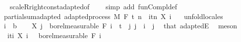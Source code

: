 \begin{isabellebody}
\isadelimproof
\ %
\endisadelimproof
%
\isatagproof
{}\isamarkupfalse%
\ scaleR{\isacharunderscore}{\kern0pt}right{\isacharunderscore}{\kern0pt}const{\isacharunderscore}{\kern0pt}adapted{\isacharbrackleft}{\kern0pt}of\ {\isachardoublequoteopen}{\isasymlambda}{\isacharunderscore}{\kern0pt}{\isachardot}{\kern0pt}\ {\isacharminus}{\kern0pt}{}{\isachardoublequoteclose}{\isacharbrackright}{\kern0pt}\ \isamarkupfalse%
\ {\isacharparenleft}{\kern0pt}simp\ add{\isacharcolon}{\kern0pt}\ fun{\isacharunderscore}{\kern0pt}Compl{\isacharunderscore}{\kern0pt}def{\isacharparenright}{\kern0pt}%
\endisatagproof
{\isafoldproof}%
%
\isadelimproof
%
\endisadelimproof
\isanewline
\isanewline
{}\isamarkupfalse%
\ partial{\isacharunderscore}{\kern0pt}sum{\isacharunderscore}{\kern0pt}adapted{\isacharcolon}{\kern0pt}\ {\isachardoublequoteopen}adapted{\isacharunderscore}{\kern0pt}process\ M\ F\ t\ {\isacharparenleft}{\kern0pt}{\isasymlambda}n\ {\isasymxi}{\isachardot}{\kern0pt}\ {\isasymSum}i{\isasymin}{\isacharbraceleft}{\kern0pt}tn{\isacharbraceright}{\kern0pt}{\isachardot}{\kern0pt}\ X\ i\ {\isasymxi}{\isacharparenright}{\kern0pt}{\isachardoublequoteclose}\ \isanewline
%
\isadelimproof
%
\endisadelimproof
%
\isatagproof
{}\isamarkupfalse%
\ {\isacharparenleft}{\kern0pt}unfold{\isacharunderscore}{\kern0pt}locales{\isacharparenright}{\kern0pt}\isanewline
\ \ \isamarkupfalse%
\ i\ {\isacharcolon}{\kern0pt}{\isacharcolon}{\kern0pt}\ {\isacharprime}{\kern0pt}b\isanewline
\ \ \isamarkupfalse%
\ {\isachardoublequoteopen}X\ j\ {\isasymin}\ borel{\isacharunderscore}{\kern0pt}measurable\ {\isacharparenleft}{\kern0pt}F\ i{\isacharparenright}{\kern0pt}{\isachardoublequoteclose}\ \ {\isachardoublequoteopen}t\ {\isasymle}\ j{\isachardoublequoteclose}\ {\isachardoublequoteopen}j\ {\isasymle}\ i{\isachardoublequoteclose}\ \ j\ \isamarkupfalse%
\ that\ adaptedE\ \isamarkupfalse%
\ meson\isanewline
\ \ \isamarkupfalse%
\ {\isachardoublequoteopen}{\isacharparenleft}{\kern0pt}{\isasymlambda}{\isasymxi}{\isachardot}{\kern0pt}\ {\isasymSum}i{\isasymin}{\isacharbraceleft}{\kern0pt}ti{\isacharbraceright}{\kern0pt}{\isachardot}{\kern0pt}\ X\ i\ {\isasymxi}{\isacharparenright}{\kern0pt}\ {\isasymin}\ borel{\isacharunderscore}{\kern0pt}measurable\ {\isacharparenleft}{\kern0pt}F\ i{\isacharparenright}{\kern0pt}{\isachardoublequoteclose}\ \isamarkupfalse%

\end{isabellebody}
